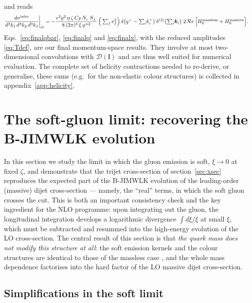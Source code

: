 \documentclass[11pt,a4paper]{article}
\newcommand{\calD}{\mathcal{D}}
\newcommand{\Spe}{S_{\perp}}
\newcommand{\vk}{\bm{k}}
\newcommand{\vl}{\bm{l}}
\numberwithin{equation}{section}
\begin{document}
and reads
\begin{align}
\label{eq:finalx}
\frac{d\sigma^{\rm inter}}{d^{3}k_{1}\,d^{3}k_{2}\,d^{3}k_{3}}\bigg|_{\rm el} =
-\frac{e^{2}g^{2}\,\eta\,\zeta\,C_{F}N_{c}\;\Spe}{8\,(2\pi)^{6}\,\xi\,q^{+2}}\,
\Big(\textstyle\sum_{f}e^{2}_{f}\Big)\,
\delta\big(q^{+}-{\textstyle\sum_i} k^{+}_{i}\big)\,
\delta^{(2)}\big({\textstyle\sum_i}\vk_{i}\big)\;
2\,{\mathcal Re}\,\Big[H_{0}^{\text{massless}}+H_{0}^{\text{massive}}\Big].
\end{align}
Eqs.~\eqref{eq:finalqbar}, \eqref{eq:finalq} and \eqref{eq:finalx}, with the reduced
amplitudes \eqref{eq:Tdef}, are our final momentum-space results. They involve at most
two-dimensional convolutions with $\calD(\vl)$ and are thus well suited for numerical
evaluation. The complete set of helicity contractions needed to re-derive, or generalise,
these sums (e.g.\ for the non-elastic colour structures) is collected in
appendix~\ref{app:helicity}.

\section{The soft-gluon limit: recovering the B-JIMWLK evolution}
\label{sec:soft}

In this section we study the limit in which the gluon emission is soft, $\xi\to 0$ at fixed
$\zeta$, and demonstrate that the trijet cross-section of section~\ref{sec:xsec} reproduces
the expected part of the B-JIMWLK evolution of the leading-order (massive) dijet
cross-section --- namely, the ``real'' terms, in which the soft gluon crosses the cut. This
is both an important consistency check and the key ingredient for the NLO programme: upon
integrating out the gluon, the longitudinal integration develops a logarithmic divergence
$\int d\xi/\xi$ at small $\xi$, which must be subtracted and resummed into the high-energy
evolution of the LO cross-section. The central result of this section is that \emph{the quark
mass does not modify this structure at all}: the soft emission kernels and the colour
structures are identical to those of the massless case \cite{Iancu:2022gpw}, and the whole
mass dependence factorises into the hard factor of the LO massive dijet cross-section.

\subsection{Simplifications in the soft limit}
\label{sec:softwf}
\end{document}
